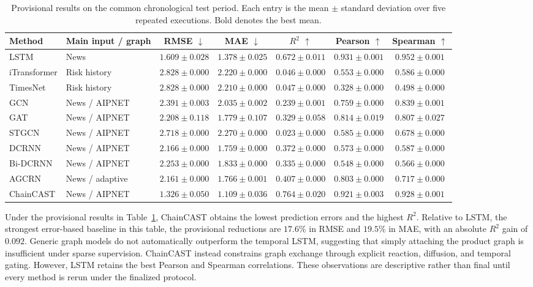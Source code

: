 \documentclass[letterpaper]{article} %
\begin{document}
\begin{table}[t]
\centering
\small
\setlength{\tabcolsep}{4.2pt}
\begin{tabular}{llccccc}
\toprule
Method & Main input / graph & RMSE \(\downarrow\) & MAE \(\downarrow\) & \(R^2\) \(\uparrow\) & Pearson \(\uparrow\) & Spearman \(\uparrow\) \\
\midrule
LSTM & News & \(1.609{\pm}0.028\) & \(1.378{\pm}0.025\) & \(0.672{\pm}0.011\) & \(\mathbf{0.931}{\pm}0.001\) & \(\mathbf{0.952}{\pm}0.001\) \\
iTransformer & Risk history & \(2.828{\pm}0.000\) & \(2.220{\pm}0.000\) & \(0.046{\pm}0.000\) & \(0.553{\pm}0.000\) & \(0.586{\pm}0.000\) \\
TimesNet & Risk history & \(2.828{\pm}0.000\) & \(2.210{\pm}0.000\) & \(0.047{\pm}0.000\) & \(0.328{\pm}0.000\) & \(0.498{\pm}0.000\) \\
GCN & News / AIPNET & \(2.391{\pm}0.003\) & \(2.035{\pm}0.002\) & \(0.239{\pm}0.001\) & \(0.759{\pm}0.000\) & \(0.839{\pm}0.001\) \\
GAT & News / AIPNET & \(2.208{\pm}0.118\) & \(1.779{\pm}0.107\) & \(0.329{\pm}0.058\) & \(0.814{\pm}0.019\) & \(0.807{\pm}0.027\) \\
STGCN & News / AIPNET & \(2.718{\pm}0.000\) & \(2.270{\pm}0.000\) & \(0.023{\pm}0.000\) & \(0.585{\pm}0.000\) & \(0.678{\pm}0.000\) \\
DCRNN & News / AIPNET & \(2.166{\pm}0.000\) & \(1.759{\pm}0.000\) & \(0.372{\pm}0.000\) & \(0.573{\pm}0.000\) & \(0.587{\pm}0.000\) \\
Bi-DCRNN & News / AIPNET & \(2.253{\pm}0.000\) & \(1.833{\pm}0.000\) & \(0.335{\pm}0.000\) & \(0.548{\pm}0.000\) & \(0.566{\pm}0.000\) \\
AGCRN & News / adaptive & \(2.161{\pm}0.000\) & \(1.766{\pm}0.001\) & \(0.407{\pm}0.000\) & \(0.803{\pm}0.000\) & \(0.717{\pm}0.000\) \\
\midrule
ChainCAST & News / AIPNET & \(\mathbf{1.326}{\pm}0.050\) & \(\mathbf{1.109}{\pm}0.036\) & \(\mathbf{0.764}{\pm}0.020\) & \(0.921{\pm}0.003\) & \(0.928{\pm}0.001\) \\
\bottomrule
\end{tabular}
\caption{Provisional results on the common chronological test period. Each entry is the mean \(\pm\) standard deviation over five repeated executions. Bold denotes the best mean.}
\label{tab:main-results}
\end{table}

Under the provisional results in Table~\ref{tab:main-results}, ChainCAST obtains the lowest prediction errors and the highest \(R^2\). Relative to LSTM, the strongest error-based baseline in this table, the provisional reductions are \(17.6\%\) in RMSE and \(19.5\%\) in MAE, with an absolute \(R^2\) gain of \(0.092\). Generic graph models do not automatically outperform the temporal LSTM, suggesting that simply attaching the product graph is insufficient under sparse supervision. ChainCAST instead constrains graph exchange through explicit reaction, diffusion, and temporal gating. However, LSTM retains the best Pearson and Spearman correlations. These observations are descriptive rather than final until every method is rerun under the finalized protocol.
\end{document}
